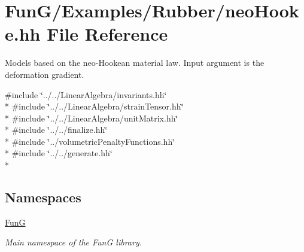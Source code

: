 \hypertarget{neoHooke_8hh}{\section{Fun\-G/\-Examples/\-Rubber/neo\-Hooke.hh File Reference}
\label{neoHooke_8hh}
}


Models based on the neo-\/\-Hookean material law. Input argument is the deformation gradient.  


{\ttfamily \#include \char`\"{}../../\-Linear\-Algebra/invariants.\-hh\char`\"{}}\\*
{\ttfamily \#include \char`\"{}../../\-Linear\-Algebra/strain\-Tensor.\-hh\char`\"{}}\\*
{\ttfamily \#include \char`\"{}../../\-Linear\-Algebra/unit\-Matrix.\-hh\char`\"{}}\\*
{\ttfamily \#include \char`\"{}../../finalize.\-hh\char`\"{}}\\*
{\ttfamily \#include \char`\"{}../volumetric\-Penalty\-Functions.\-hh\char`\"{}}\\*
{\ttfamily \#include \char`\"{}../../generate.\-hh\char`\"{}}\\*
\subsection*{Namespaces}
\begin{DoxyCompactItemize}
\item 
\hyperlink{namespaceFunG}{Fun\-G}
\begin{DoxyCompactList}\small\item\em Main namespace of the Fun\-G library. \end{DoxyCompactList}\end{DoxyCompactItemize}
